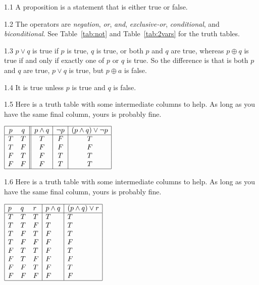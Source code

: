 \begin{RequAnswer}{1.1}
A proposition is a statement that is either true or false.
\end{RequAnswer}
\begin{RequAnswer}{1.2}
The operators are {\em negation}, {\em or}, {\em and}, {\em exclusive-or}, {\em conditional}, and {\em biconditional}.
See Table~\ref{tab:not} and  Table~\ref{tab:2vars} for the truth tables.
\end{RequAnswer}
\begin{RequAnswer}{1.3}
$p\vee q$ is true if $p$ is true, $q$ is true, or both $p$ and $q$ are true, whereas
$p\oplus q$ is true if and only if exactly one of $p$ or $q$ is true. So the difference is
that is both $p$ and $q$ are true, $p\vee q$ is true, but $p\oplus a$ is false.
\end{RequAnswer}
\begin{RequAnswer}{1.4}
It is true unless $p$ is true and $q$ is false.
\end{RequAnswer}
\begin{RequAnswer}{1.5}
Here is a truth table with some intermediate columns to help. As long as you have the same final column, yours is probably fine.

$\begin{array}{|cc||c|c|c|} \hline p & q & p  \wedge q & \neg p&(p \wedge q) \vee\neg p \\
\hline
T & T & T & F&T\\
T & F & F & F&F \\
F & T & F & T&T \\
F & F & F & T&T\\
\hline
\end{array}$
\end{RequAnswer}
\begin{RequAnswer}{1.6}
Here is a truth table with some intermediate columns to help. As long as you have the same final column, yours is probably fine.

$\begin{array}{|lll|l|l|}
\hline
p & q & r & p\wedge q& (p\wedge q)\vee r\\
\hline
T & T & T & T &T\\
T & T & F & T &T\\
T & F & T & F &T\\
T & F & F & F &F\\
F & T & T & F &T\\
F & T & F & F &F\\
F & F & T & F &T\\
F & F & F & F &F\\
\hline
\end{array}$
\end{RequAnswer}
